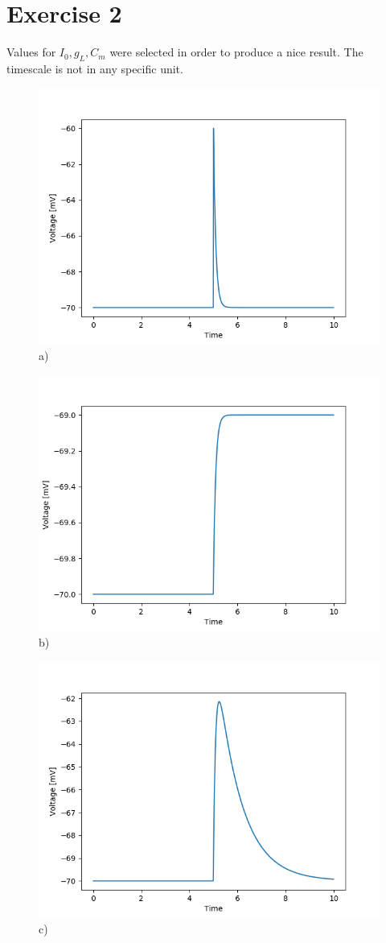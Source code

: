 \documentclass[a4paper]{article}
\begin{document}
\section*{Exercise 2}
Values for $I_0, g_L, C_m$ were selected in order to produce a nice result.
The timescale is not in any specific unit.
\begin{figure}[htbp]
    \centering
    \includegraphics{a.png}
\caption{a)}
\end{figure}
\begin{figure}[htbp]
    \centering
    \includegraphics{b.png}
\caption{b)}
\end{figure}
\begin{figure}[htbp]
    \centering
    \includegraphics{c.png}
\caption{c)}
\end{figure}
\end{document}
